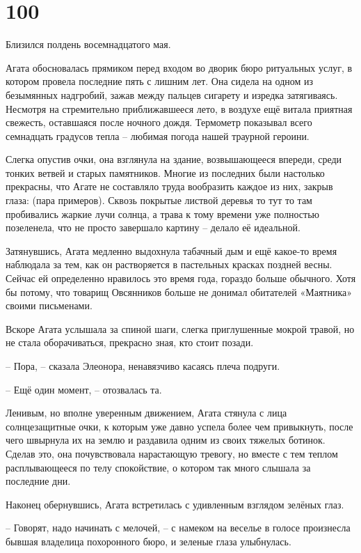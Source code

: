 \documentclass[
  a5paperpaper,
  DIV=11,
  numbers=noendperiod]{scrreprt}
\begin{document}
\section*{100}\label{100}


Близился полдень восемнадцатого мая.

Агата обосновалась прямиком перед входом во дворик бюро ритуальных
услуг, в котором провела последние пять с лишним лет. Она сидела на
одном из безымянных надгробий, зажав между пальцев сигарету и изредка
затягиваясь. Несмотря на стремительно приближавшееся лето, в воздухе ещё
витала приятная свежесть, оставшаяся после ночного дождя. Термометр
показывал всего семнадцать градусов тепла -- любимая погода нашей
траурной героини.

Слегка опустив очки, она взглянула на здание, возвышающееся впереди,
среди тонких ветвей и старых памятников. Многие из последних были
настолько прекрасны, что Агате не составляло труда вообразить каждое из
них, закрыв глаза: (пара примеров). Сквозь покрытые листвой деревья то
тут то там пробивались жаркие лучи солнца, а трава к тому времени уже
полностью позеленела, что не просто завершало картину -- делало её
идеальной.

Затянувшись, Агата медленно выдохнула табачный дым и ещё какое-то время
наблюдала за тем, как он растворяется в пастельных красках поздней
весны. Сейчас ей определенно нравилось это время года, гораздо больше
обычного. Хотя бы потому, что товарищ Овсянников больше не донимал
обитателей «Маятника» своими письменами.

Вскоре Агата услышала за спиной шаги, слегка приглушенные мокрой травой,
но не стала оборачиваться, прекрасно зная, кто стоит позади.

-- Пора, -- сказала Элеонора, ненавязчиво касаясь плеча подруги.

-- Ещё один момент, -- отозвалась та.

Ленивым, но вполне уверенным движением, Агата стянула с лица
солнцезащитные очки, к которым уже давно успела более чем привыкнуть,
после чего швырнула их на землю и раздавила одним из своих тяжелых
ботинок. Сделав это, она почувствовала нарастающую тревогу, но вместе с
тем теплом расплывающееся по телу спокойствие, о котором так много
слышала за последние дни.

Наконец обернувшись, Агата встретилась с удивленным взглядом зелёных
глаз.

-- Говорят, надо начинать с мелочей, -- с намеком на веселье в голосе
произнесла бывшая владелица похоронного бюро, и зеленые глаза
улыбнулась.
\end{document}

